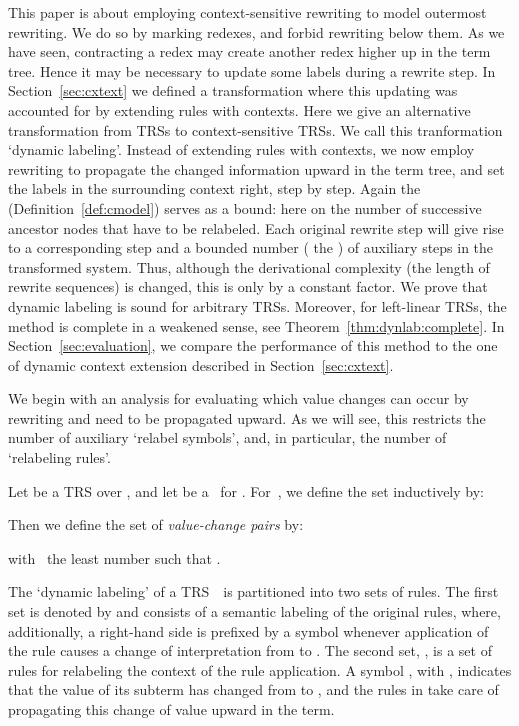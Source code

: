 
This paper is about employing context-sensitive rewriting to model outermost rewriting.
We do so by marking redexes, and forbid rewriting below them.
As we have seen, contracting a redex may create another redex higher up in the term tree.
Hence it may be necessary to update some labels during a rewrite step.
In Section~\ref{sec:cxtext} we defined a transformation where this updating 
was accounted for by extending rules with contexts.
Here we give an alternative transformation from TRSs to context-sensitive TRS{s}.
We call this tranformation `dynamic labeling'.
Instead of extending rules with contexts, 
we now employ rewriting to propagate the changed information upward in the term tree,
and set the labels in the surrounding context right, step by step.
Again the \cdepth{} (Definition~\ref{def:cmodel}) serves as a bound:
here on the number of successive ancestor nodes that have to be relabeled.
Each original rewrite step will give rise to a corresponding step and a bounded number ( the \cdepth{}) 
of auxiliary steps in the transformed system. 
Thus, although the derivational complexity (the length of rewrite sequences) 
is changed, this is only by a constant factor.
We prove that dynamic labeling is sound for arbitrary TRSs.
Moreover, for left-linear TRSs, the method is complete in a weakened sense, 
see Theorem~\ref{thm:dynlab:complete}.
In Section~\ref{sec:evaluation}, we compare the performance of this method 
to the one of dynamic context extension described in Section~\ref{sec:cxtext}.

We begin with an analysis for evaluating which value changes can occur by rewriting and need to be propagated upward.
As we will see, this restricts the number of auxiliary `relabel symbols', and, in particular,
the number of `relabeling rules'.

\begin{definition}\label{def:value-change-pairs}
  Let  be a TRS over , 
  and let  be a \clabeling\ for .
  For \,, we define the set  inductively by:
  
  Then we define the set  of \emph{value-change pairs} by:
  
  with \, the least number
  such that .
\end{definition}

The `dynamic labeling'  of a TRS~\, is partitioned into two sets of rules.
The first set is denoted by 
and consists of a semantic labeling of the original rules,
where, additionally, a right-hand side is prefixed by a symbol  
whenever application of the rule causes a change of interpretation from  to .
The second set, , 
is a set of rules for relabeling the context of the rule application.
A symbol , with ,
indicates that the value of its subterm has changed from  to ,
and the rules in  
take care of propagating this change of value upward in the term.

